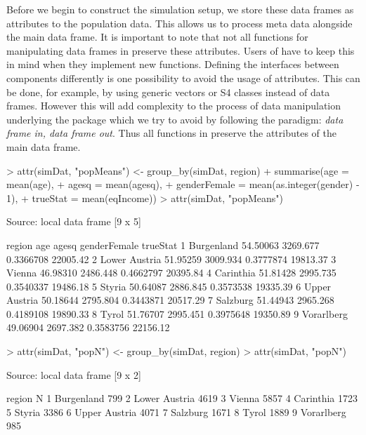 \documentclass[article]{ajs}
\begin{document}
Before we begin to construct the simulation setup, we store these data frames as attributes to the population data. This allows us to process meta data alongside the main data frame. It is important to note that not all functions for manipulating data frames in  preserve these attributes. Users of  have to keep this in mind when they implement new functions. Defining the interfaces between components differently is one possibility to avoid the usage of attributes. This can be done, for example, by using generic vectors or S4 classes instead of data frames. However this will add complexity to the process of data manipulation underlying the package which we try to avoid by following the paradigm: \textit{data frame in, data frame out}. Thus all functions in  preserve the attributes of the main data frame.

\begin{Schunk}
\begin{Sinput}
> attr(simDat, "popMeans") <- group_by(simDat, region) %
+   summarise(age = mean(age),
+             agesq = mean(agesq),
+             genderFemale = mean(as.integer(gender) - 1),
+             trueStat = mean(eqIncome))
> attr(simDat, "popMeans")
\end{Sinput}
\begin{Soutput}
Source: local data frame [9 x 5]

         region      age    agesq genderFemale trueStat
1    Burgenland 54.50063 3269.677    0.3366708 22005.42
2 Lower Austria 51.95259 3009.934    0.3777874 19813.37
3        Vienna 46.98310 2486.448    0.4662797 20395.84
4     Carinthia 51.81428 2995.735    0.3540337 19486.18
5        Styria 50.64087 2886.845    0.3573538 19335.39
6 Upper Austria 50.18644 2795.804    0.3443871 20517.29
7      Salzburg 51.44943 2965.268    0.4189108 19890.33
8         Tyrol 51.76707 2995.451    0.3975648 19350.89
9    Vorarlberg 49.06904 2697.382    0.3583756 22156.12
\end{Soutput}
\begin{Sinput}
> attr(simDat, "popN") <- group_by(simDat, region) %
> attr(simDat, "popN")
\end{Sinput}
\begin{Soutput}
Source: local data frame [9 x 2]

         region    N
1    Burgenland  799
2 Lower Austria 4619
3        Vienna 5857
4     Carinthia 1723
5        Styria 3386
6 Upper Austria 4071
7      Salzburg 1671
8         Tyrol 1889
9    Vorarlberg  985
\end{Soutput}
\end{Schunk}
\end{document}
